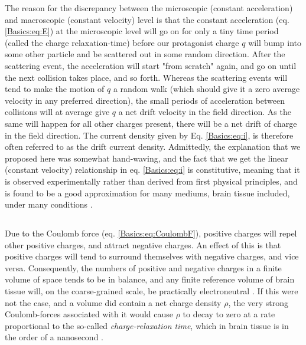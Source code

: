 The reason for the discrepancy between the microscopic (constant acceleration) and macroscopic (constant velocity) level is that the constant acceleration (eq. \ref{Basics:eq:E}) at the microscopic level will go on for only a tiny time period (called the charge relaxation-time)  before our protagonist charge $q$ will bump into some other particle and be scattered out in some random direction. After the scattering event, the acceleration will start "from scratch" again, and go on until the next collision takes place, and so forth. Whereas the scattering events will tend to make the motion of $q$ a random walk (which should give it a zero average velocity in any preferred direction), the small periods of acceleration between collisions will at average give $q$ a net drift velocity in the field direction. As the same will happen for all other charges present, there will be a net drift of charge in the field direction. The current density given by Eq. \ref{Basics:eq:i}, is therefore often referred to as the drift current density. Admittedly, the explanation that we proposed here was somewhat hand-waving, and the fact that we get the linear (constant velocity) relationship in eq. \ref{Basics:eq:i} is constitutive, meaning that it is observed experimentally rather than derived from first physical principles, and is found to be a good approximation for many mediums, brain tissue included, under many conditions \citep{Nunez2006, Pettersen2012}. 


\subsection{}
\label{sec:Basics:Electroneutrality}
Due to the Coulomb force (eq. \ref{Basics:eq:CoulombF}), positive charges will repel other positive charges, and attract negative charges. An effect of this is that positive charges will tend to surround themselves with negative charges, and vice versa. Consequently, the numbers of positive and negative charges in a finite volume of space tends to be in balance, and any finite reference volume of brain tissue will, on the coarse-grained scale, be practically electroneutral \cite{Nunez2006, Grodzinsky2011}. If this were not the case, and a volume did contain a net charge density $\rho$, the very strong Coulomb-forces associated with it would cause $\rho$ to decay to zero at a rate proportional to the so-called \textit{charge-relaxation time}, which in brain tissue is in the order of a nanosecond \cite{Grodzinsky2011}. 

